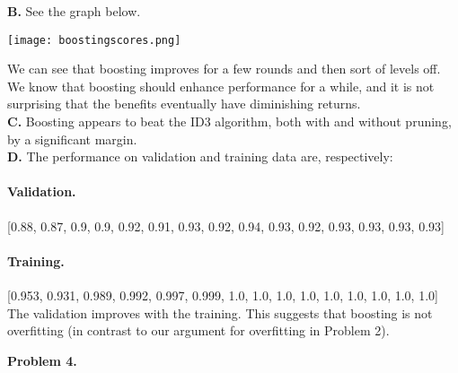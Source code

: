 \documentclass[12pt]{amsart}
\theoremstyle{remark}
\begin{document}
\textbf{B.} See the graph below. 

\texttt{[image: boostingscores.png]}

We can see that boosting improves for a few rounds and then sort of levels off. We know that boosting should enhance performance for a while, and it is not surprising that the benefits eventually have diminishing returns. \\

\textbf{C.} Boosting appears to beat the ID3 algorithm, both with and without pruning, by a significant margin. \\

\textbf{D.} The performance on validation and training data are, respectively:\\

\paragraph{Validation.}  [0.88, 0.87, 0.9, 0.9, 0.92, 0.91, 0.93, 0.92, 0.94, 0.93, 0.92, 0.93, 0.93, 0.93, 0.93]\\
 

\paragraph{Training.} [0.953, 0.931, 0.989, 0.992, 0.997, 0.999, 1.0, 1.0, 1.0, 1.0, 1.0, 1.0, 1.0, 1.0, 1.0] \\

The validation improves with the training. This suggests that boosting is not overfitting (in contrast to our argument for overfitting in Problem 2). 

\newpage

\noindent \textbf{Problem 4.} 
\end{document}
